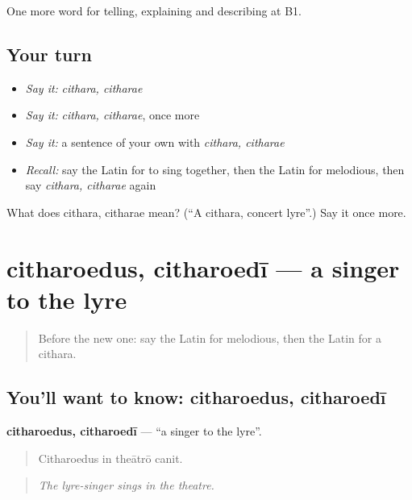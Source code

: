 \begin{grammarlens}[title={What you've built}]
One more word for telling, explaining and describing at B1.
\end{grammarlens}

\subsection*{Your turn}
\begin{itemize}
\raggedright
  \item \emph{Say it:} \emph{cithara, citharae}
  \item \emph{Say it:} \emph{cithara, citharae}, once more
  \item \emph{Say it:} a sentence of your own with \emph{cithara, citharae}
  \item \emph{Recall:} say the Latin for to sing together, then the Latin for melodious, then say \emph{cithara, citharae} again
\end{itemize}

\begin{tcolorbox}[breakable,colback=teal!4,colframe=teal!35!black,title={Before you move on}]
What does cithara, citharae mean? (\textquotedblleft{}A cithara, concert lyre\textquotedblright{}.) Say it once more.
\end{tcolorbox}
\section[citharoedus, citharoedī]{citharoedus, citharoedī — a singer to the lyre}

\label{lesson:LA-C544-citharoedus}



\begin{quote}
Before the new one: say the Latin for melodious, then the Latin for a cithara.
\end{quote}

\subsection*{You'll want to know: citharoedus, citharoedī}
\textbf{citharoedus, citharoedī} — \textquotedblleft{}a singer to the lyre\textquotedblright{}.

\begin{quote}
Citharoedus in theātrō canit.
\end{quote}

\begin{quote}
\emph{The lyre-singer sings in the theatre.}
\end{quote}


